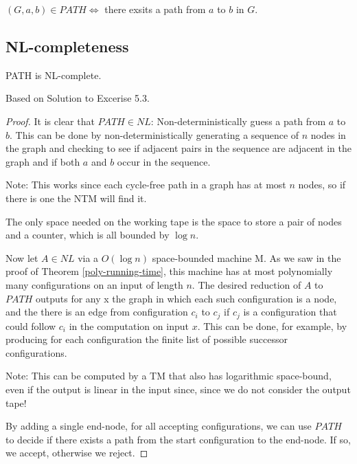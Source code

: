 $(G, a, b) \in PATH \Leftrightarrow $ there exsits a path from $a$ to
$b$ in $G$.

\subsection{NL-completeness}\label{nl-completeness}

\vspace{0.5cm}

\begin{thm}
\label{path-nl-complete}
PATH is NL-complete.
\end{thm}

Based on  Solution to Excerise
5.3.

\begin{proof}
It is clear that $PATH \in NL$: Non-deterministically guess a path from
$a$ to $b$. This can be done by non-deterministically generating a sequence of $n$
nodes in the graph and checking to see if adjacent pairs in the sequence are
adjacent in the graph and if both $a$ and $b$ occur in the sequence.

Note: This works since each cycle-free path in a graph has at most $n$ nodes, so if there is one the NTM will find it.

The only space needed on the working tape is the space to store a pair of nodes and a counter, which is all bounded by $\log n$.

Now let $A \in NL$ via a $O(\log n)$ space-bounded machine M. As we saw in the proof of Theorem \ref{poly-running-time},
this machine has at most polynomially many configurations on an input of length $n$.
The desired reduction of $A$ to $PATH$ outputs for any x the
graph in which each such configuration is a node, and the there is an edge
from configuration $c_i$ to $c_j$ if $c_j$ is a configuration that could follow $c_i$ in the computation on
input $x$. This can be done, for example, by producing for each configuration the finite list of possible successor configurations.

Note: This can be computed by a TM that also has logarithmic space-bound, even if the output is linear in the input since,
since we do not consider the output tape!

By adding a single end-node, for all accepting configurations, we can use $PATH$ to decide if there exists a path
from the start configuration to the end-node. If so, we accept, otherwise we reject.
\end{proof}

